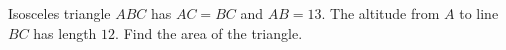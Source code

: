 Isosceles triangle $ABC$ has $AC=BC$ and $AB=13$. The altitude from $A$ to line $BC$ has length $12$. Find the area of the triangle.

